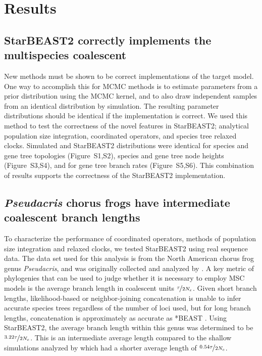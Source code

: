 \documentclass[nogrid]{MBE}%
\begin{document}
\section{Results}

\subsection{StarBEAST2 correctly implements the multispecies coalescent}

New methods must be shown to be correct implementations of the
target model. One way to accomplish this for MCMC methods is to estimate
parameters from a prior distribution using the MCMC kernel, and to also draw
independent samples from an identical distribution by simulation. The resulting
parameter distributions should be identical if the implementation is correct. We
used this method to test the correctness of the novel features in StarBEAST2;
analytical population size integration, coordinated operators, and species tree
relaxed clocks. Simulated and StarBEAST2 distributions were identical
for species and gene tree topologies (Figure~S1,S2), species and gene tree node
heights (Figure~S3,S4), and for gene tree branch rates (Figure~S5,S6). This
combination of results supports the correctness of the StarBEAST2
implementation.

\subsection{\textit{Pseudacris} chorus frogs have intermediate coalescent branch lengths}

To characterize the performance of coordinated operators, methods of population size
integration and relaxed clocks, we tested StarBEAST2 using real sequence data.
The data set used for this analysis is from the North American chorus frog genus
\textit{Pseudacris}, and was originally collected and analyzed by
\cite{Barrow201478}. A key metric of phylogenies that can be used to judge
whether it is necessary to employ MSC models is the average
branch length in coalescent units $\nicefrac{\tau}{2N_e}$. Given short branch
lengths, likelihood-based or neighbor-joining concatenation is unable to infer accurate species trees regardless of
the number of loci used, but for long branch lengths, concatenation is
approximately as accurate as *BEAST \citep{Ogilvie01052016}. Using StarBEAST2,
the average branch length within this genus was determined to be
$\nicefrac{3.22\tau}{2N_e}$. This is an intermediate average length compared to
the shallow simulations analyzed by \cite{Ogilvie01052016} which had a shorter
average length of $\nicefrac{0.54\tau}{2N_e}$.
\end{document}
